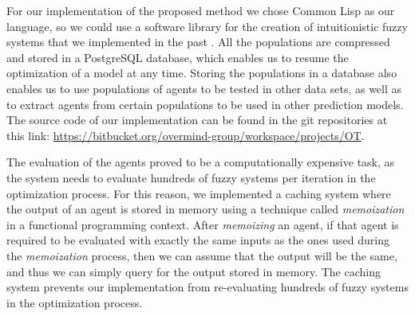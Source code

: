 \documentclass{ieeeaccess}
\begin{document}
For our implementation of the proposed method we chose Common Lisp as
our language, so we could use a software library for the creation of
intuitionistic fuzzy systems that we implemented in the past
\cite{Hernandez-Aguila2016} \cite{Hernandez-Aguila2017-2}. All the
populations are compressed and stored in a PostgreSQL database, which
enables us to resume the optimization of a model at any time. Storing
the populations in a database also enables us to use populations of
agents to be tested in other data sets, as well as to extract agents
from certain populations to be used in other prediction models. The
source code of our implementation can be found in the git repositories
at this link:
\url{https://bitbucket.org/overmind-group/workspace/projects/OT}.

The evaluation of the agents proved to be a computationally expensive
task, as the system needs to evaluate hundreds of fuzzy systems per
iteration in the optimization process. For this reason, we implemented
a caching system where the output of an agent is stored in memory
using a technique called \textit{memoization}
\cite{johnson1995memoization} in a functional programming
context. After \textit{memoizing} an agent, if that agent is required
to be evaluated with exactly the same inputs as the ones used during
the \textit{memoization} process, then we can assume that the output
will be the same, and thus we can simply query for the output stored
in memory. The caching system prevents our implementation from
re-evaluating hundreds of fuzzy systems in the optimization process.



\end{document}
